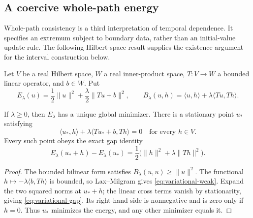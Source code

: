 \subsection{A coercive whole-path energy}
\label{sec:temporal-variational}

Whole-path consistency is a third interpretation of temporal dependence.
It specifies an extremum subject to boundary data, rather than an
initial-value update rule. The following Hilbert-space result supplies
the existence argument for the interval construction below.

Let $V$ be a real Hilbert space, $W$ a real inner-product space,
$T:V\to W$ a bounded linear operator, and $b\in W$. Put
\[
 E_\lambda(u)=\frac12\lVert u\rVert^2
       +\frac\lambda2\lVert Tu+b\rVert^2,\qquad
 B_\lambda(u,h)=\langle u,h\rangle+\lambda\langle Tu,Th\rangle.
\]

\begin{theorem}
\label{thm:variational-minimum}
If $\lambda\ge0$, then $E_\lambda$ has a unique global minimizer.
There is a stationary point $u_*$ satisfying
\begin{equation}\label{eq:variational-weak}
 \langle u_*,h\rangle+\lambda\langle Tu_*+b,Th\rangle=0
 \quad\text{for every }h\in V.
\end{equation}
Every such point obeys the exact gap identity
\begin{equation}\label{eq:variational-gap}
 E_\lambda(u_*+h)-E_\lambda(u_*)
 =\frac12\bigl(\lVert h\rVert^2+\lambda\lVert Th\rVert^2\bigr).
\end{equation}
\end{theorem}
\begin{proof}
The bounded bilinear form satisfies
$B_\lambda(u,u)\ge\lVert u\rVert^2$.
The functional $h\mapsto-\lambda\langle b,Th\rangle$ is bounded,
so Lax--Milgram gives \eqref{eq:variational-weak}.
Expand the two squared norms at $u_*+h$; the linear cross terms
vanish by stationarity, giving \eqref{eq:variational-gap}.
Its right-hand side is nonnegative and is zero only if $h=0$.
Thus $u_*$ minimizes the energy, and any other minimizer equals it.
\end{proof}



